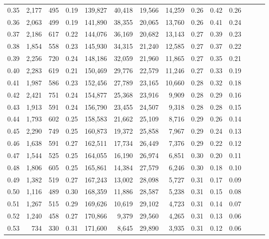 \begin{tabular}{rrrrrrrrrrrrrr}
0.35 &  2,177 &  495 &  0.19 &  139,827 &   40,418 &  19,566 &  14,259 &  0.26 &  0.42 &      0.26 \\
0.36 &  2,063 &  499 &  0.19 &  141,890 &   38,355 &  20,065 &  13,760 &  0.26 &  0.41 &      0.24 \\
0.37 &  2,186 &  617 &  0.22 &  144,076 &   36,169 &  20,682 &  13,143 &  0.27 &  0.39 &      0.23 \\
0.38 &  1,854 &  558 &  0.23 &  145,930 &   34,315 &  21,240 &  12,585 &  0.27 &  0.37 &      0.22 \\
0.39 &  2,256 &  720 &  0.24 &  148,186 &   32,059 &  21,960 &  11,865 &  0.27 &  0.35 &      0.21 \\
0.40 &  2,283 &  619 &  0.21 &  150,469 &   29,776 &  22,579 &  11,246 &  0.27 &  0.33 &      0.19 \\
0.41 &  1,987 &  586 &  0.23 &  152,456 &   27,789 &  23,165 &  10,660 &  0.28 &  0.32 &      0.18 \\
0.42 &  2,421 &  751 &  0.24 &  154,877 &   25,368 &  23,916 &   9,909 &  0.28 &  0.29 &      0.16 \\
0.43 &  1,913 &  591 &  0.24 &  156,790 &   23,455 &  24,507 &   9,318 &  0.28 &  0.28 &      0.15 \\
0.44 &  1,793 &  602 &  0.25 &  158,583 &   21,662 &  25,109 &   8,716 &  0.29 &  0.26 &      0.14 \\
0.45 &  2,290 &  749 &  0.25 &  160,873 &   19,372 &  25,858 &   7,967 &  0.29 &  0.24 &      0.13 \\
0.46 &  1,638 &  591 &  0.27 &  162,511 &   17,734 &  26,449 &   7,376 &  0.29 &  0.22 &      0.12 \\
0.47 &  1,544 &  525 &  0.25 &  164,055 &   16,190 &  26,974 &   6,851 &  0.30 &  0.20 &      0.11 \\
0.48 &  1,806 &  605 &  0.25 &  165,861 &   14,384 &  27,579 &   6,246 &  0.30 &  0.18 &      0.10 \\
0.49 &  1,382 &  519 &  0.27 &  167,243 &   13,002 &  28,098 &   5,727 &  0.31 &  0.17 &      0.09 \\
0.50 &  1,116 &  489 &  0.30 &  168,359 &   11,886 &  28,587 &   5,238 &  0.31 &  0.15 &      0.08 \\
0.51 &  1,267 &  515 &  0.29 &  169,626 &   10,619 &  29,102 &   4,723 &  0.31 &  0.14 &      0.07 \\
0.52 &  1,240 &  458 &  0.27 &  170,866 &    9,379 &  29,560 &   4,265 &  0.31 &  0.13 &      0.06 \\
0.53 &    734 &  330 &  0.31 &  171,600 &    8,645 &  29,890 &   3,935 &  0.31 &  0.12 &      0.06 \\

\end{tabular}
